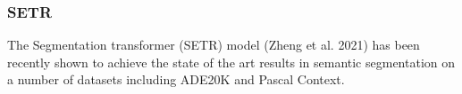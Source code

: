 \documentclass[letterpaper]{article} %
\begin{document}



 

 
 
\subsubsection{SETR}
The Segmentation transformer (SETR) model (Zheng et al. 2021) has been recently shown to achieve the state of the art results in semantic segmentation on a number of datasets including ADE20K and Pascal Context.
\end{document}
